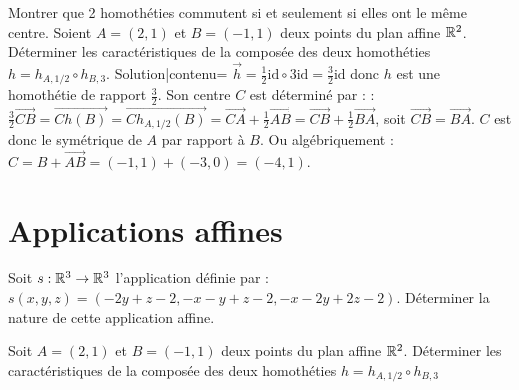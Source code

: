 \ee
\medskip
\be
Montrer que 2 homoth\'eties commutent si et seulement si elles ont le m\^eme centre.
\ee
\medskip
\be
Soient $A=(2,1)$ et $B=(-1,1)$ deux points du plan affine $\mathbb{R}^2$. Déterminer les caractéristiques
de la composée des deux homothéties $h=h_{A,1/2}\circ h_{B,3}$.
{{Solution|contenu=
$\vec h=\frac12\mathrm{id}\circ3\mathrm{id}=\frac32\mathrm{id}$ donc $h$ est une homothétie de rapport $\frac32$. Son centre $C$ est déterminé par :
:$\frac32\overrightarrow{CB}=\overrightarrow{Ch(B)}=\overrightarrow{Ch_{A,1/2}(B)}=\overrightarrow{CA}+\frac12\overrightarrow{AB}=\overrightarrow{CB}+\frac12\overrightarrow{BA}$, soit $\overrightarrow{CB}=\overrightarrow{BA}$.
$C$ est donc le symétrique de $A$ par rapport à $B$. Ou algébriquement : $C=B+\overrightarrow{AB}=(-1,1)+(-3,0)=(-4,1)$.
}}
\ee


\section{Applications affines}
\medskip

\be
Soit $s : \mathbb{R}^3 \to \mathbb{R}^3$ l'application définie par : $s(x,y,z)=(-2y+z-2,-x-y+z-2,-x-2y+2z-2)$. Déterminer la nature de cette application affine.
\ee

\medskip

\be
Soit $A=(2,1)$ et $B=(-1,1)$ deux points du plan affine $\mathbb{R}^2$. Déterminer les caractéristiques de la composée des deux homothéties $h=h_{A,1/2}\circ h_{B,3}$
\ee

\medskip

